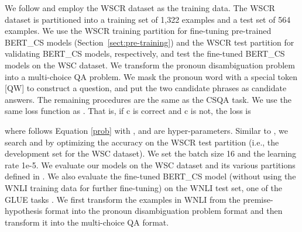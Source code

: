 \documentclass[11pt,a4paper]{article}
\begin{document}
We follow \citet{kocijan2019surprisingly} and employ the WSCR dataset \citep{rahman-ng-2012-resolving} as the training data. The WSCR dataset is partitioned into a training set of 1,322 examples and a test set of 564 examples. We use the WSCR training partition for fine-tuning pre-trained BERT\_CS models (Section~\ref{sect:pre-training}) and the WSCR test partition for validating BERT\_CS models, respectively, and test the fine-tuned BERT\_CS models on the WSC dataset.  We transform the pronoun disambiguation problem into a multi-choice QA problem. We mask the pronoun word with a special token [QW] to construct a question, and put the two candidate phrases as candidate answers.
The remaining procedures are the same as the CSQA task.
We use the same loss function as \citet{kocijan2019surprisingly}. 
That is, if c is correct and c is not, the loss is

where  follows Equation \ref{prob} with ,  and  are hyper-parameters.
Similar to \citet{kocijan2019surprisingly}, we search  and  by optimizing the accuracy on the WSCR test partition (i.e., the development set for the WSC dataset).
We set the batch size 16 and the learning rate 1e-5.
We evaluate our models on the WSC dataset and its various partitions defined in \citet{trichelair-etal-2019-reasonable}. 
We also evaluate the fine-tuned BERT\_CS model (without using the WNLI training data for further fine-tuning) on the WNLI test set, one of the GLUE tasks \citep{wang-etal-2018-glue}.
We first transform the examples in WNLI from the premise-hypothesis format into the pronoun disambiguation problem format \citep{kocijan2019surprisingly} and then transform it into the multi-choice QA format.
\end{document}
